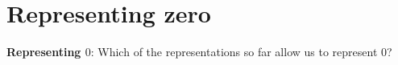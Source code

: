 \documentclass[12pt, oneside]{article}
\begin{document}
\section*{Representing zero}


{\bf Representing $0$}: Which of the representations so far allow us to represent $0$?

\vfill


 \vfill
\end{document}
